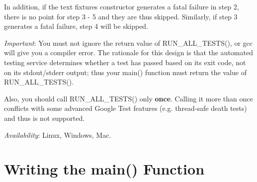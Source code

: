 In addition, if the text fixture\textquotesingle{}s constructor generates a fatal failure in step 2, there is no point for step 3 -\/ 5 and they are thus skipped. Similarly, if step 3 generates a fatal failure, step 4 will be skipped.

{\itshape Important}\+: You must not ignore the return value of {\ttfamily R\+U\+N\+\_\+\+A\+L\+L\+\_\+\+T\+E\+S\+T\+S()}, or {\ttfamily gcc} will give you a compiler error. The rationale for this design is that the automated testing service determines whether a test has passed based on its exit code, not on its stdout/stderr output; thus your {\ttfamily main()} function must return the value of {\ttfamily R\+U\+N\+\_\+\+A\+L\+L\+\_\+\+T\+E\+S\+T\+S()}.

Also, you should call {\ttfamily R\+U\+N\+\_\+\+A\+L\+L\+\_\+\+T\+E\+S\+T\+S()} only {\bfseries once}. Calling it more than once conflicts with some advanced Google Test features (e.\+g. thread-\/safe death tests) and thus is not supported.

{\itshape Availability}\+: Linux, Windows, Mac.

\section*{Writing the main() Function}

